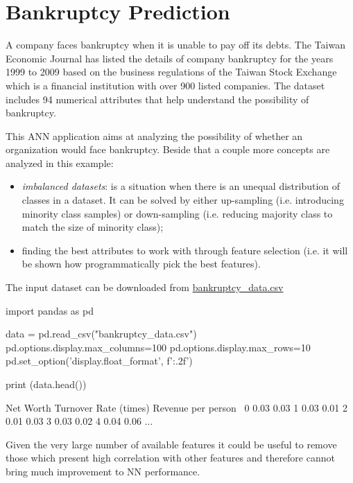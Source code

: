 \section{Bankruptcy Prediction}
A company faces bankruptcy when it is unable to pay off its debts. The Taiwan Economic Journal has listed the details of company bankruptcy for the years 1999 to 2009 based on the business regulations of the Taiwan Stock Exchange which is a financial institution with over 900 listed companies. The dataset includes 94 numerical attributes that help understand the possibility of bankruptcy.

This ANN application aims at analyzing the possibility of whether an organization would face bankruptcy. Beside that a couple more concepts are analyzed in this example:
\begin{itemize}
\item \emph{imbalanced datasets}: is a situation when there is an unequal distribution of classes in a dataset. It can be solved by either up-sampling (i.e. introducing minority class samples) or down-sampling (i.e. reducing majority class to match the size of minority class);
\item finding the best attributes to work with through feature selection (i.e. it will be shown how programmatically pick the best features).
\end{itemize}

The input dataset can be downloaded from \href{https://raw.githubusercontent.com/matteosan1/finance_course/develop/libro/input_files/bankruptcy_data.csv}{bankruptcy\_data.csv}
\begin{ipython}
import pandas as pd
	
data = pd.read_csv("bankruptcy_data.csv")
pd.options.display.max_columns=100
pd.options.display.max_rows=10
pd.set_option('display.float_format', f'{:.2f}')
	
print (data.head())
\end{ipython}
\begin{ioutput}
Net Worth Turnover Rate (times)  Revenue per person  \
0                          0.03                0.03   
1                          0.03                0.01   
2                          0.01                0.03   
3                          0.03                0.02   
4                          0.04                0.06   
...                        
\end{ioutput}

Given the very large number of available features it could be useful to remove those which present high correlation with other features and therefore cannot bring much improvement to NN performance.

